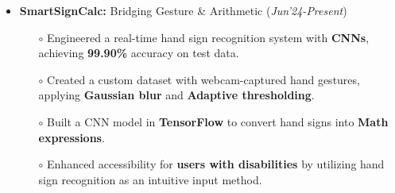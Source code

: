 \documentclass[10.8pt, a4paper]{extarticle}
\begin{document}
{\begin{itemize}
\begin{itemize}
\item[$\circ$] Integrated \textbf{AI chatbots} to provide instant fitness advice, tips, and support, driving a 25\% increase in user interaction.\\[-0.6cm]

\item[$\circ$] Built \textbf{data visualization} tools for tracking fitness progress through interactive charts and graphs.\\[-0.6cm]

\item[$\circ$] Implemented \textbf{social features} for users to connect, join groups, share progress, and participate in challenges. \\[-0.6cm]

\item[$\circ$] Pioneered \textbf{AR} workout modules, creating immersive fitness experiences with virtual trails and 3D yoga instructors.\\[-0.6cm]


	\end{itemize}



 \item \textbf{SmartSignCalc:} Bridging Gesture \& Arithmetic
\href{https://github.com/vishalsavarna/SmartSignCalc-Bridging_Gesture_and_Arithmetic}{\faGithub{}} \hfill(\textit{Jun'24-Present})
	\\[-0.6cm]
	\begin{itemize}
	    \item[$\circ$] Engineered a real-time hand sign recognition system with \textbf{CNNs}, achieving \textbf{99.90\%} accuracy on test data.\\[-0.6cm]


\item[$\circ$] Created a custom dataset with webcam-captured hand gestures, applying \textbf{Gaussian blur} and \textbf{Adaptive thresholding}.\\[-0.6cm]

\item[$\circ$] Built a CNN model in \textbf{TensorFlow} to convert hand signs into \textbf{Math expressions}.\\[-0.6cm]

\item[$\circ$] Enhanced accessibility for \textbf{users with disabilities} by utilizing hand sign recognition as an intuitive input method.\\[-0.6cm]


\end{itemize}
\end{itemize}}
\end{document}
